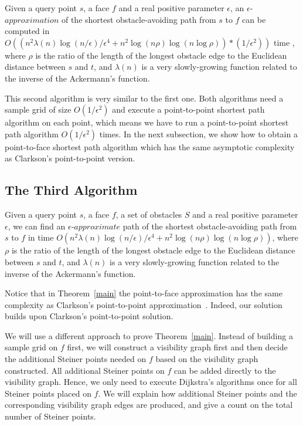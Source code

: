 \documentclass{llncs}
\begin{document}
\begin{theorem}
Given a query point $s$, a face $f$ and a real positive parameter $\epsilon$, an $\epsilon$-$approximation$ of
the shortest obstacle-avoiding path from $s$ to $f$ can be computed in $O((n^2\lambda(n)\log(n/\epsilon)/{\epsilon}^4+n^2\log (n\rho) \log(n\log\rho))*(1/\epsilon^2))$ time
, where $\rho$ is the ratio of the length of the longest obstacle edge to the
Euclidean distance between $s$ and $t$, and $\lambda(n)$ is a very slowly-growing function related to
the inverse of the Ackermann's function.
\end{theorem}

This second algorithm is very similar to the first one. Both algorithms need a sample grid of size $O(1/\epsilon^2)$ and execute a point-to-point shortest path algorithm on each point, which means we have to run a point-to-point shortest path algorithm $O(1/\epsilon^2)$ times.
In the next subsection, we show how to obtain a point-to-face shortest path algorithm which has the same asymptotic complexity as Clarkson's point-to-point version.

\subsection{The Third Algorithm}
\begin{theorem}
\label{main}
Given a query point $s$, a face $f$, a set of obstacles $S$ and a real positive parameter $\epsilon$, we can find an $\epsilon$-$approximate$ path of
the shortest obstacle-avoiding path from $s$ to $f$ in time
$O(n^2\lambda(n)\log(n/\epsilon)/{\epsilon}^4+n^2\log (n\rho) \log(n\log\rho))$, where $\rho$ is the ratio of the length of the longest obstacle edge to the
Euclidean distance between $s$ and $t$, and $\lambda(n)$ is a very slowly-growing function related to
the inverse of the Ackermann's function.
\end{theorem}
Notice that in Theorem~\ref{main} the point-to-face approximation has the same complexity as Clarkson's
point-to-point approximation~\cite{Clar87}. Indeed, our solution builds upon Clarkson's point-to-point solution.

We will use a different approach to prove Theorem~\ref{main}.
Instead of building a sample grid on $f$ first, we will construct a visibility graph first and then
decide the additional Steiner points needed on $f$ based on the visibility graph constructed.
All additional Steiner points on $f$ can be added directly to the visibility graph.
Hence, we only need to execute Dijkstra's algorithms once for all Steiner points placed on $f$.
We will explain how additional Steiner points and the corresponding visibility graph edges are produced, and give a count on the total number of Steiner points.
\end{document}
